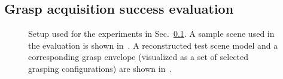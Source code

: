 \subsection{Grasp acquisition success evaluation}
\label{sec:online_evaluation}
%
\begin{figure}[t!]
\centering
{}
\caption{Setup used for the experiments in Sec.~\ref{sec:online_evaluation}. A sample scene used in the evaluation is shown in~. A reconstructed test scene model and a corresponding grasp envelope (visualized as a set of selected grasping configurations) are shown in~.}
\label{fig:tests2}
\end{figure}
%
%
\renewcommand{\arraystretch}{1.5}
\renewcommand{\tabcolsep}{1.5mm}
